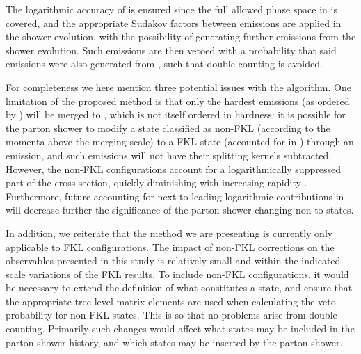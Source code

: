 The logarithmic accuracy of \pyt is ensured since the full allowed phase
space in \pyt is covered, and the appropriate Sudakov factors between
emissions are applied in the shower evolution, with the possibility of
generating further emissions from the shower evolution. Such emissions are
then vetoed with a probability that said emissions were also generated from
\HEJ, such that double-counting is avoided.

For completeness we here mention three potential issues with the
algorithm. One limitation of the proposed method is that only the hardest
emissions (as ordered by \pyt) will be merged to \HEJ, which is not itself
ordered in hardness: it is possible for the parton shower to modify a state
classified as non-FKL (according to the momenta above the merging scale) to a
FKL state (accounted for in \HEJ) through an emission, and such emissions
will not have their splitting kernels subtracted. 
However, the non-FKL configurations account for a logarithmically suppressed
part of the cross section, quickly diminishing with increasing
rapidity \cite{Andersen:2017kfc}. Furthermore, future accounting for
next-to-leading logarithmic contributions in \HEJ will decrease further the
significance of the parton shower changing non-\HEJ to \HEJ states.


In addition, we reiterate that the method we are presenting is currently only applicable to FKL configurations. 
The impact of non-FKL corrections on the observables presented in this study is relatively small and within the indicated scale variations of the FKL results.
To include non-FKL configurations, it would be necessary to extend the definition of what constitutes a \HEJ state, and ensure that the appropriate tree-level matrix elements are used when calculating the veto probability for non-FKL states.
This is so that no problems arise from double-counting. Primarily such changes would affect what states may be included in the parton shower history, and which states may be inserted by the parton shower.

